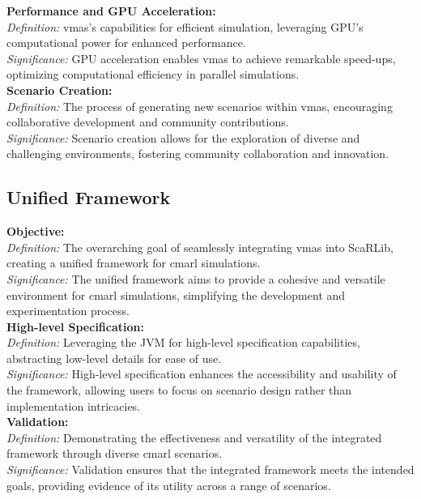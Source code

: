 \documentclass[12pt,a4paper,openright,twoside]{book}
\begin{document}
\textbf{Performance and GPU Acceleration:}\\
\textit{Definition:} \ac{vmas}'s capabilities for efficient simulation, leveraging GPU's computational power for enhanced performance.\\
\textit{Significance:} GPU acceleration enables \ac{vmas} to achieve remarkable speed-ups, optimizing computational efficiency in parallel simulations.\\

\textbf{Scenario Creation:}\\
\textit{Definition:} The process of generating new scenarios within \ac{vmas}, encouraging collaborative development and community contributions.\\
\textit{Significance:} Scenario creation allows for the exploration of diverse and challenging environments, fostering community collaboration and innovation.\\

\subsection{Unified Framework}

\textbf{Objective:}\\
\textit{Definition:} The overarching goal of seamlessly integrating \ac{vmas} into ScaRLib, creating a unified framework for \ac{cmarl} simulations.\\
\textit{Significance:} The unified framework aims to provide a cohesive and versatile environment for \ac{cmarl} simulations, simplifying the development and experimentation process.\\

\textbf{High-level Specification:}\\
\textit{Definition:} Leveraging the JVM for high-level specification capabilities, abstracting low-level details for ease of use.\\
\textit{Significance:} High-level specification enhances the accessibility and usability of the framework, allowing users to focus on scenario design rather than implementation intricacies.\\

\textbf{Validation:}\\
\textit{Definition:} Demonstrating the effectiveness and versatility of the integrated framework through diverse \ac{cmarl} scenarios.\\
\textit{Significance:} Validation ensures that the integrated framework meets the intended goals, providing evidence of its utility across a range of scenarios.\\
\end{document}

